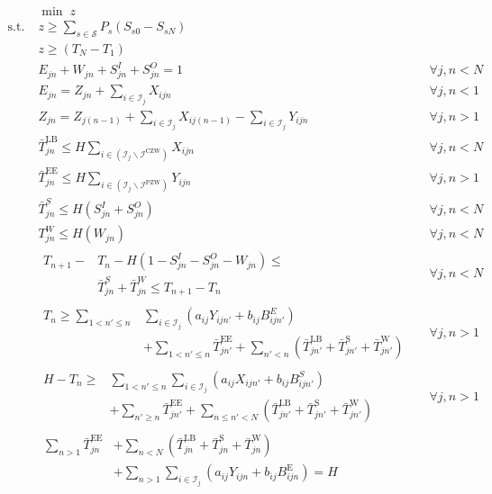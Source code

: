 \begin{align}
&\min \; z &&\\
\text{s.t.}\; &z \ge \sum_{s\in \mathcal{S}} P_s (S_{s0} - S_{sN}) && \\
		  & z \ge (T_N - T_1)  &&\\
		  & E_{jn} + W_{jn} + S_{jn}^I + S_{jn}^O = 1 && \forall j , n < N \\
		  & E_{jn} = Z_{jn} + \sum_{i \in \mathcal{I}_j} X_{ijn} && \forall j, n < 1 \\
		  & Z_{jn} = Z_{j(n-1)} + \sum_{i \in \mathcal{I}_j} X_{ij(n-1)} - \sum_{i \in \mathcal{I}_j} Y_{ijn} && \forall j, n > 1 \\
		  & \bar{T}_{jn}^{\text{LB}} \le H \sum_{i \in (\mathcal{I}_j \backslash \mathcal{I}^\text{CZW})} X_{ijn} &&\forall j, n < N \\ 
		  & \bar{T}_{jn}^{\text{EE}} \le H \sum_{i \in (\mathcal{I}_j \backslash \mathcal{I}^\text{PZW})} Y_{ijn} &&\forall j, n > 1 \\
		  & \bar{T}_{jn}^S \le H ( S_{jn}^I + S_{jn}^O ) && \forall j, n < N \\
		  & T_{jn}^W \le H (W_{jn}) && \forall j, n < N \\
&\begin{aligned}
T_{n+1} - & T_n - H (1 - S_{jn}^I - S_{jn}^O - W_{jn}) \le \\  &\bar{T}_{jn}^S + \bar{T}_{jn}^W \le T_{n+1} - T_n  
\end{aligned}&&\forall j, n < N \\
&\begin{aligned}
T_n \ge \sum_{1 < n' \le n} &\sum_{i \in \mathcal{I}_j} (a_{ij} Y_{ijn'} + b _{ij} B_{ijn'}^E) \\ &+ \sum_{1 < n' \le n} \bar{T}_{jn'}^{\text{EE}} + \sum_{n' < n} (\bar{T}_{jn'}^{\text{LB}} + \bar{T}_{jn'}^{\text{S}} + \bar{T}_{jn'}^{\text{W}})
\end{aligned} && \forall j, n > 1 \\
&\begin{aligned}
H - T_n \ge &\sum_{1 < n' \le n} \sum_{i \in \mathcal{I}_j} (a_{ij} X_{ijn'} + b _{ij} B_{ijn'}^S) \\ &+ \sum_{n' \ge n} \bar{T}_{jn'}^{\text{EE}} + \sum_{n \le n' < N} (\bar{T}_{jn'}^{\text{LB}} + \bar{T}_{jn'}^{\text{S}} + \bar{T}_{jn'}^{\text{W}})
\end{aligned}  && \forall j, n > 1 \\
&\begin{aligned}
\sum_{n > 1} \bar{T}_{jn}^{\text{EE}} &+ \sum_{n<N}(\bar{T}_{jn}^\text{LB} + \bar{T}_{jn}^{\text{S}} + \bar{T}_{jn}^\text{W}) \\ &+\sum_{n>1} \sum_{i \in \mathcal{I}_j} (a_{ij} Y _{ijn} + b_{ij} B_{ijn}^\text{E}) = H

\end{aligned}
\end{align}
